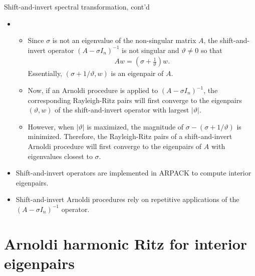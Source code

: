 \documentclass[t,usepdftitle=false]{beamer}
\begin{document}
\begin{frame}{Shift-and-invert spectral transformation, cont'd}
	\begin{itemize}
	\item[]
	\begin{itemize}\normalsize
	\item[] Since $\sigma$ is not an eigenvalue of the non-singular matrix $A$, the shift-and-invert operator $(A-\sigma I_n)^{-1}$ is not singular and $\vartheta\neq 0$ so that 
	\begin{align*}
		Aw=\left(\sigma+\frac{1}{\vartheta}\right)w.
	\end{align*}
	Essentially, $(\sigma+1/\vartheta,w)$ is an eigenpair of $A$.
	\item Now, if an Arnoldi procedure is applied to $(A-\sigma I_n)^{-1}$, the corresponding Rayleigh-Ritz pairs will first converge to the eigenpairs $(\vartheta,w)$ of the shift-and-invert operator with largest $|\vartheta|$.
	\item However, when $|\vartheta|$ is maximized, the magnitude of $\sigma-(\sigma+1/\vartheta)$ is minimized. Therefore, the Rayleigh-Ritz pairs of a shift-and-invert Arnoldi procedure will first converge to the eigenpairs of $A$ with eigenvalues closest to $\sigma$.
	\end{itemize}
   	\item Shift-and-invert operators are implemented in ARPACK to compute interior eigenpairs.
   	\item Shift-and-invert Arnoldi procedures rely on repetitive applications of the $(A-\sigma I_n)^{-1}$ operator.
	\end{itemize}
\end{frame}

\section{Arnoldi harmonic Ritz for interior eigenpairs}
\end{document}
